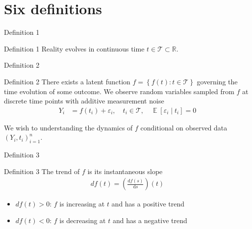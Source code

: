 \documentclass[ignorenonframetext,xcolor=pdflatex,table,dvipsnames,serif]{beamer}
\DeclareMathOperator{\E}{\mathbb{E}}
\begin{document}

\section{Six definitions}

\begin{frame}{Definition 1}
\begin{alertblock}{Definition 1}
  Reality evolves in continuous time $t \in \mathcal{T} \subset \mathbb{R}$.
\end{alertblock}  
\end{frame}


\begin{frame}{Definition 2}
\begin{alertblock}{Definition 2}
  There exists a latent function $f = \left\{f(t) : t \in \mathcal{T}\right\}$ governing the time evolution of some outcome. We observe random variables sampled from $f$ at discrete time points with additive measurement noise
  \begin{align*}
	  Y_i &= f(t_i) + \varepsilon_i, \quad t_i \in \mathcal{T}, \quad \E[\varepsilon_i \mid t_i] = 0
  \end{align*}
  
  We wish to understanding the dynamics of $f$ conditional on observed data $(Y_i, t_i)_{i=1}^{n}$.  
\end{alertblock}    
\end{frame}



\begin{frame}{Definition 3}
\begin{alertblock}{Definition 3}
  The \alert{trend} of $f$ is its instantaneous slope
  \begin{align*}
	  df(t) = \left(\frac{\mathrm{d} f(s)}{\mathrm{d}s}\right)(t)
  \end{align*}
  \begin{itemize}
    \item{$df(t) > 0$: $f$ is increasing at $t$ and has a \alert{positive trend}}
	\item{$df(t) < 0$: $f$ is decreasing at $t$ and has a \alert{negative trend}}
  \end{itemize}
\end{alertblock}    
\end{frame}
\end{document}
